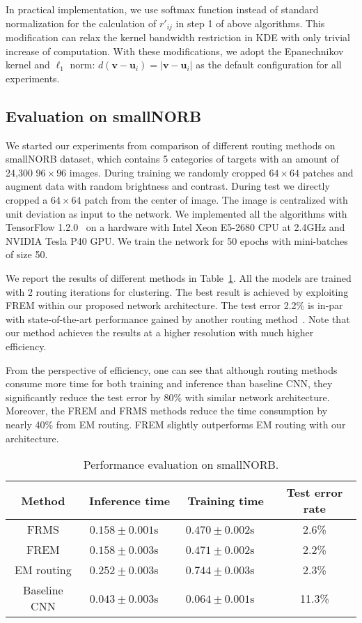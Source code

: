 \documentclass[runningheads]{llncs}
\begin{document}
In practical implementation, we use softmax function instead of standard normalization for the calculation of $r'_{ij}$ in step 1 of above algorithms. This modification can relax the kernel bandwidth restriction in KDE with only trivial increase of computation. With these modifications, we adopt the Epanechnikov kernel and $\ell_1$ norm: $d(\boldsymbol{v}-\boldsymbol{u}_i)=|\boldsymbol{v}-\boldsymbol{u}_i|$ as the default configuration for all experiments.

\subsection{Evaluation on smallNORB}
We started our experiments from comparison of different routing methods on smallNORB dataset, which contains 5 categories of targets with an amount of 24,300 $96\times{96}$ images. During training we randomly cropped $64\times{64}$ patches and augment data with random brightness and contrast. During test we directly cropped a $64\times{64}$ patch from the center of image. The image is centralized with unit deviation as input to the network. We implemented all the algorithms with TensorFlow 1.2.0~\cite{abadi2016tensorflow} on a hardware with Intel Xeon E5-2680 CPU at 2.4GHz and NVIDIA Tesla P40 GPU. We train the network for 50 epochs with mini-batches of size 50. 

We report the results of different methods in Table~\ref{tab:norb}. All the models are trained with 2 routing iterations for clustering. The best result is achieved by exploiting FREM within our proposed network architecture. The test error 2.2\% is in-par with state-of-the-art performance gained by another routing method~\cite{hinton2018emrouting}. Note that our method achieves the results at a higher resolution with much higher efficiency. 

From the perspective of efficiency, one can see that although routing methods consume more time for both training and inference than baseline CNN, they significantly reduce the test error by 80\% with similar network architecture. Moreover, the FREM and FRMS methods reduce the time consumption by nearly 40\% from EM routing. FREM slightly outperforms EM routing with our architecture.
\begin{table}
\centering
\caption{Performance evaluation on smallNORB.}
\label{tab:norb}
\begin{tabular}{cccc}
\toprule
Method & Inference time$\quad$ & Training time$\quad$ & Test error rate  \\
\midrule
FRMS & $0.158\pm{0.001}$s$\quad$ & $0.470\pm{0.002}$s$\quad$ & 2.6\% \\
FREM & $0.158\pm{0.003}$s$\quad$ & $0.471\pm{0.002}$s$\quad$ & 2.2\%\\
EM routing & $0.252\pm{0.003}$s$\quad$ & $0.744\pm{0.003}$s$\quad$ & 2.3\%\\
Baseline CNN & $0.043\pm{0.003}$s$\quad$ & $0.064\pm{0.001}$s$\quad$ & 11.3\%\\
\bottomrule
\end{tabular}
\end{table}
\end{document}
